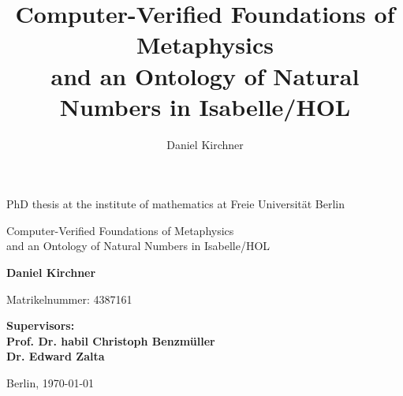 \documentclass[a4paper,enabledeprecatedfontcommands,abstract=on,twoside=true]{scrreprt}
\title{Computer-Verified Foundations of Metaphysics\\ and an Ontology of Natural Numbers in Isabelle/HOL}
\author{Daniel Kirchner}
\numberwithin{TODO}{chapter}
\numberwithin{equation}{section}
\begin{document}
\begin{titlepage}
\vspace{1cm}

\begin{center}
    \vspace{1cm}


PhD thesis at the institute of mathematics at Freie Universit\"at Berlin

    \vspace{2cm}


    \Large{\textsf{Computer-Verified Foundations of Metaphysics\\ and an Ontology of Natural Numbers in Isabelle/HOL}}

    \vspace{2cm}

    \large{\textbf{Daniel Kirchner}}

	\vspace{0.25cm}

	\small{Matrikelnummer: 4387161}

    \vspace{2cm}

    \large{\textbf{
        Supervisors:\\
Prof. Dr. habil Christoph Benzm\"uller\\
Dr. Edward Zalta
    }}

    \vspace{2cm}
    \large{Berlin, \today}
\end{center}
\end{titlepage}

\cleardoublepage
\end{document}

